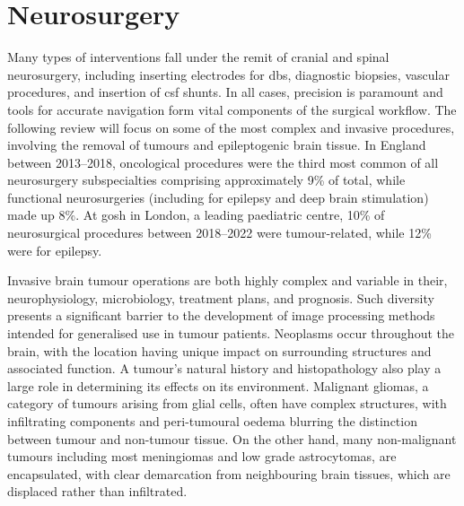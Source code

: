 
\section{Neurosurgery}\label{sec:neurosurgery}


Many types of interventions fall under the remit of cranial and spinal neurosurgery, including inserting electrodes for \gls{dbs}, diagnostic biopsies, vascular procedures, and insertion of \gls{csf} shunts.
In all cases, precision is paramount and tools for accurate navigation form vital components of the surgical workflow.
The following review will focus on some of the most complex and invasive procedures, involving the removal of tumours and epileptogenic brain tissue.
In England between 2013--2018, oncological procedures were the third most common of all neurosurgery subspecialties comprising approximately 9\% of total, while functional neurosurgeries (including for epilepsy and deep brain stimulation) made up 8\%\autocite{Wahba2022}.
At \gls{gosh} in London, a leading paediatric centre, 10\% of neurosurgical procedures between 2018--2022 were tumour-related, while 12\% were for epilepsy\autocite{gosh2023}.

Invasive brain tumour operations are both highly complex and variable in their, neurophysiology, microbiology, treatment plans, and prognosis.
Such diversity presents a significant barrier to the development of image processing methods intended for generalised use in tumour patients\autocite{Bauer2013}.
Neoplasms occur throughout the brain, with the location having unique impact on surrounding structures and associated function.
A tumour's natural history and histopathology also play a large role in determining its effects on its environment.
Malignant gliomas, a category of tumours arising from glial cells, often have complex structures, with infiltrating components and peri-tumoural oedema blurring the distinction between tumour and non-tumour tissue\autocite{Weller2021}.
On the other hand, many non-malignant tumours including most meningiomas and low grade astrocytomas, are encapsulated, with clear demarcation from neighbouring brain tissues, which are displaced rather than infiltrated\autocite{Lu2004,Gerard2017}.

